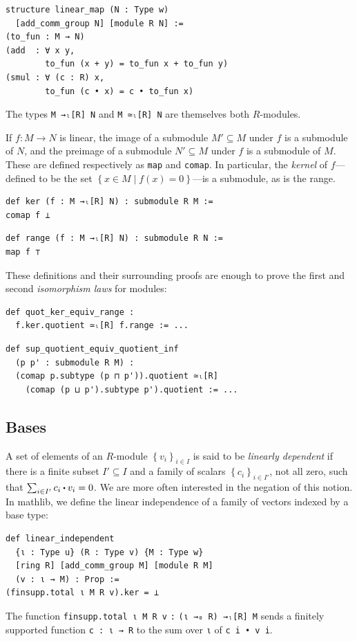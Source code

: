 \documentclass[sigplan]{acmart}\settopmatter{}
\newcommand{\mathlib}{\textsf{mathlib}\xspace}
\newcommand\smul[1][.5]{\mathbin{\vcenter{\hbox{\scalebox{#1}{$\bullet$}}}}}
\begin{document}
\begin{lstlisting}
structure linear_map (N : Type w)
  [add_comm_group N] [module R N] :=
(to_fun : M → N)
(add  : ∀ x y,
        to_fun (x + y) = to_fun x + to_fun y)
(smul : ∀ (c : R) x,
        to_fun (c • x) = c • to_fun x)
\end{lstlisting}
The types \lstinline{M →ₗ[R] N} and \lstinline{M ≃ₗ[R] N} are themselves both $R$-modules.

If $f : M \to N$ is linear,
the image of a submodule $M' \subseteq M$ under $f$ is a submodule of $N$,
and the preimage of a submodule $N' \subseteq M$ under $f$ is a submodule of $M$.
These are defined respectively as \lstinline{map} and \lstinline{comap}.
In particular, the \emph{kernel} of $f$---defined to be the set
$\left\{ x \in M \mid f(x)=0 \right\}$---is a submodule, as is the range.

\begin{lstlisting}
def ker (f : M →ₗ[R] N) : submodule R M :=
comap f ⊥
\end{lstlisting}
\begin{lstlisting}
def range (f : M →ₗ[R] N) : submodule R N :=
map f ⊤
\end{lstlisting}

These definitions and their surrounding proofs
are enough to prove the first and second \emph{isomorphism laws} for modules:

\begin{lstlisting}
def quot_ker_equiv_range :
  f.ker.quotient ≃ₗ[R] f.range := ...
\end{lstlisting}
\begin{lstlisting}
def sup_quotient_equiv_quotient_inf
  (p p' : submodule R M) :
  (comap p.subtype (p ⊓ p')).quotient ≃ₗ[R]
    (comap (p ⊔ p').subtype p').quotient := ...
\end{lstlisting}

\subsection{Bases}
\label{subsection:linalg:bases}

A set of elements of an $R$-module $\left\{ v_i \right\} _{i \in I}$
is said to be \emph{linearly dependent} if
there is a finite subset $I' \subseteq I$
and a family of scalars $\left\{ c_i \right\} _{i \in I'}$, not all zero, such that
$\sum_{i \in I'}c_i \smul v_i = 0$.
We are more often interested in the negation of this notion.
In \mathlib, we define the linear independence of a family of vectors
indexed by a base type:
\begin{lstlisting}
def linear_independent
  {ι : Type u} (R : Type v) {M : Type w}
  [ring R] [add_comm_group M] [module R M]
  (v : ι → M) : Prop :=
(finsupp.total ι M R v).ker = ⊥
\end{lstlisting}
The function \lstinline{finsupp.total ι M R v} \lstinline{:} \lstinline{(ι →₀ R) →ₗ[R] M}
sends a finitely supported function \lstinline{c : ι → R}
to the sum over \lstinline{ι} of \lstinline{c i • v i}.
\end{document}
